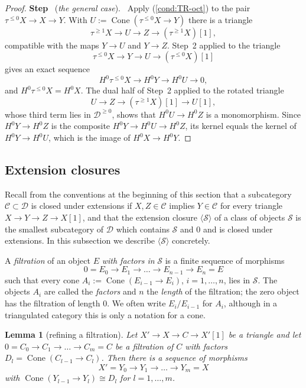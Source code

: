 \documentclass[12pt]{amsart}
\newcommand{\condref}[1]{\textup{(\ref{#1})}}
\newtheorem{lemma}[theorem]{Lemma}
\numberwithin{theorem}{section}
\theoremstyle{definition}
\newcounter{pstep}
\newcommand{\step}[1]{\par\medskip\noindent\refstepcounter{pstep}\textbf{Step \thepstep}\ (\textit{#1}).\ \ignorespaces}
\newcommand{\calD}{\mathcal{D}}
\newcommand{\Dge}[1]{\calD^{\geqslant #1}}
\newcommand{\Cone}{\operatorname{Cone}}
\begin{document}
\begin{proof}
		\step{the general case}
		Apply \condref{cond:TR-oct} to the pair $\tau^{\leqslant 0} X \to X \to Y$.
		With $U := \Cone(\tau^{\leqslant 0} X \to Y)$ there is a triangle
		\[
		\tau^{\geqslant 1} X \longrightarrow U \longrightarrow Z \longrightarrow (\tau^{\geqslant 1} X)[1] ,
		\]
		compatible with the maps $Y \to U$ and $Y \to Z$.
		Step~2 applied to the triangle 
		\[
		\tau^{\leqslant 0} X \to Y \to U \to (\tau^{\leqslant 0} X)[1]
		\] 
		gives an exact sequence 
		\[
		H^0 \tau^{\leqslant 0} X \to H^0 Y \to H^0 U \to 0,
		\] 
		and $H^0 \tau^{\leqslant 0} X = H^0 X$.
		The dual half of Step~2 applied to the rotated triangle 
		\[
		U \to Z \to (\tau^{\geqslant 1} X)[1] \to U[1],
		\] 
		whose third term lies in $\Dge{0}$, shows that $H^0 U \to H^0 Z$ is a monomorphism.
		Since $H^0 Y \to H^0 Z$ is the composite $H^0 Y \to H^0 U \to H^0 Z$, its kernel equals the kernel of $H^0 Y \to H^0 U$, which is the image of $H^0 X \to H^0 Y$.
	\end{proof}
	
	\subsection{Extension closures}
	
	Recall from the conventions at the beginning of this section that a subcategory $\mathcal{C} \subset \calD$ is closed under extensions if $X, Z \in \mathcal{C}$ implies $Y \in \mathcal{C}$ for every triangle $X \to Y \to Z \to X[1]$, and that the extension closure $\langle \mathcal{S} \rangle$ of a class of objects $\mathcal{S}$ is the smallest subcategory of $\calD$ which contains $\mathcal{S}$ and $0$ and is closed under extensions.
	In this subsection we describe $\langle \mathcal{S} \rangle$ concretely.
	
	A \emph{filtration} of an object $E$ \emph{with factors in} $\mathcal{S}$ is a finite sequence of morphisms
	\[
	0 = E_0 \to E_1 \to \ldots \to E_{n-1} \to E_n = E
	\]
	such that every cone $A_i := \Cone(E_{i-1} \to E_i)$, $i = 1, \ldots, n$, lies in $\mathcal{S}$.
	The objects $A_i$ are called the \emph{factors} and $n$ the \emph{length} of the filtration;
	the zero object has the filtration of length $0$.
	We often write $E_i / E_{i-1}$ for $A_i$, although in a triangulated category this is only a notation for a cone.
	
	\begin{lemma}[refining a filtration]
		\label{lem:refinement}
		Let $X' \to X \to C \to X'[1]$ be a triangle and let $0 = C_0 \to C_1 \to \ldots \to C_m = C$ be a filtration of $C$ with factors $D_l = \Cone(C_{l-1} \to C_l)$.
		Then there is a sequence of morphisms
		\[
		X' = Y_0 \to Y_1 \to \ldots \to Y_m = X
		\]
		with $\Cone(Y_{l-1} \to Y_l) \cong D_l$ for $l = 1, \ldots, m$.
	\end{lemma}
	
\end{document}
